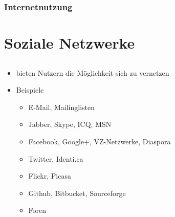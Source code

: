 \documentclass[14pt,handout]{beamer}
\begin{document}
\begin{frame}
  \frametitle{Internetnutzung}
\end{frame}


\section{Soziale Netzwerke}
\subsection{}

\begin{frame}
  \begin{itemize}
  \frametitle{Soziale Netzwerke}
    \item<2-> bieten Nutzern die Möglichkeit sich zu vernetzen
    \item<3-> Beispiele
      \begin{itemize}
        \item<4-> E-Mail, Mailinglisten
        \item<5-> Jabber, Skype, ICQ, MSN
        \item<6-> Facebook, Google+, VZ-Netzwerke, Diaspora
        \item<7-> Twitter, Identi.ca
        \item<8-> Flickr, Picasa
        \item<9-> Github, Bitbucket, Sourceforge
        \item<10-> Foren
      \end{itemize}
  \end{itemize}
\end{frame}
\end{document}
